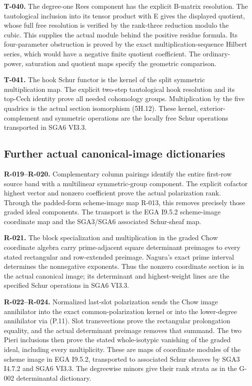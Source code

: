 \documentclass[
  10pt,
]{article}
\begin{document}
\textbf{T-040.} The degree-one Rees component has the explicit B-matrix
resolution. The tautological inclusion into its tensor product with E
gives the displayed quotient, whose full free resolution is verified by
the rank-three reduction modulo the cubic. This supplies the actual
module behind the positive residue formula. Its four-parameter
obstruction is proved by the exact multiplication-sequence Hilbert
series, which would have a negative finite quotient coefficient. The
ordinary-power, saturation and quotient maps specify the geometric
comparison.

\textbf{T-041.} The hook Schur functor is the kernel of the split
symmetric multiplication map. The explicit two-step tautological hook
resolution and its top-Cech identity prove all needed cohomology groups.
Multiplication by the five quadrics is the actual section isomorphism
(5H.12). These kernel, exterior-complement and symmetric operations are
the locally free Schur operations transported in SGA6 VI3.3.

\subsection{Further actual canonical-image
dictionaries}\label{further-actual-canonical-image-dictionaries}

\textbf{R-019--R-020.} Complementary column pairings identify the entire
first-row source band with a multilinear symmetric-group component. The
explicit cofactor highest vector and nonzero coefficient prove the
actual polarization rank. Through the padded-form scheme-image map
R-013, this removes precisely those graded ideal components. The
transport is the EGA I9.5.2 scheme-image coordinate map and the
SGA3/SGA6 associated Schur-sheaf map.

\textbf{R-021.} The block specialization and multiplication in the
graded Chow coordinate algebra carry prime-adjacent square determinant
preimages to every stated rectangular and row-extended preimage.
Nagura's exact prime interval determines the nonnegative exponents. Thus
the nonzero coordinate section is in the actual canonical image; its
determinant and highest-weight lines are the specified Schur operations
in SGA6 VI3.3.

\textbf{R-022--R-024.} Normalized last-slot polarization sends the Chow
image annihilator into the exact common-polarization kernel or into the
lower-degree annihilator via (P.11). Slot transvections prove the
rectangular prolongation equality, and the actual determinant preimage
removes that summand. The two Pieri inclusions then prove the stated
whole-isotypic vanishing of the graded ideal, including every
multiplicity. These are maps of coordinate modules of the scheme image
in EGA I9.5.2, transported to associated Schur sheaves by SGA3 I4.7.2
and SGA6 VI3.3. The degreewise minors give their rank strata as in the
G-002 determinantal dictionary.
\end{document}
